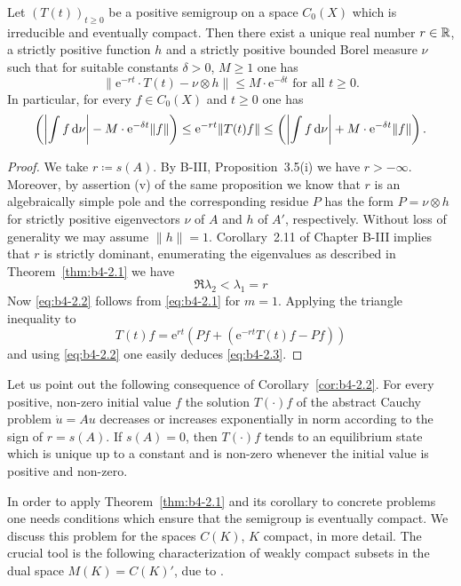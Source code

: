 \begin{corollary}\label{cor:b4-2.2}
	Let $(T(t))_{t \geq 0}$ be a positive semigroup on a space
	$C_{0}(X)$ which is irreducible and eventually compact.
	Then there exist a
	unique real number $r \in \mathbb{R}$, a strictly positive function $h$ and a
	strictly positive bounded Borel measure $\nu$ such that for suitable
	constants $\delta > 0$, $M \geq 1$ one has
	\begin{equation}\label{eq:b4-2.2}
		\|\mathrm{e}^{-rt}\cdot T(t) - \nu\otimes h\| \leq M\cdot \mathrm{e}^{-\delta t} \text{ for all } t \geq 0 .
	\end{equation}
	In particular, for every $f \in C_{0}(X)$ and $t \geq 0$ one has
	\begin{equation}\label{eq:b4-2.3} 
		\left(\left|\int f \mathop{}\!\mathrm{d}{\nu}\right| - M\cdot \mathrm{e}^{-\delta t}\|f\|\right) \leq \mathrm{e}^{-rt}\|T(t)f\| \leq \left(\left|\int f \mathop{}\!\mathrm{d}{\nu}\right| + M\cdot \mathrm{e}^{-\delta t}\|f\|\right).
	\end{equation}
\end{corollary}
\begin{proof}
	We take $r  \coloneq  s(A)$.
	By B-III, Proposition~3.5(i) we have $r > -\infty$.
	Moreover, by assertion (v) of the same proposition we know that $r$ is
	an algebraically simple pole and the corresponding residue $P$ has the
	form $P = \nu \otimes h$ for strictly positive eigenvectors $\nu$ of $A$
	and $h$ of $A'$, respectively.
	Without loss of generality we may assume
	$\|h\| = 1$.
	Corollary~2.11 of Chapter B-III implies that $r$ is strictly
	dominant, \ie enumerating the eigenvalues as described in Theorem~\ref{thm:b4-2.1} we
	have 
\[
	\Re \lambda_2 < \lambda_1 = r 
\]
%
Now \eqref{eq:b4-2.2} follows from \eqref{eq:b4-2.1} for $m = 1$.
Applying the triangle inequality to %
\[
	 T(t)f = \mathrm{e}^{rt}(Pf + (\mathrm{e}^{-rt}T(t)f-Pf)) 
\]
%
and using \eqref{eq:b4-2.2} one easily deduces \eqref{eq:b4-2.3}.
\end{proof}
Let us point out the following consequence of Corollary~\ref{cor:b4-2.2}.
For every positive, non-zero initial value $f$ the solution $T(\cdot)f$
of the abstract Cauchy problem $\dot{u} = Au$ decreases or increases
exponentially in norm according to the sign of $r = s(A)$.
If $s(A) = 0$, then $T(\cdot)f$ tends to an equilibrium state which is
unique up to a constant and is non-zero whenever the initial value is
positive and non-zero.

In order to apply Theorem~\ref{thm:b4-2.1} and its corollary to concrete problems one
needs conditions which ensure that the semigroup is eventually compact.
We discuss this problem for the spaces $C(K)$, $K$ compact, in
more detail.
The crucial tool is the following characterization of
weakly compact subsets in the dual space $M(K) = C(K)'$, due to
\citet{grothendieck:1953}.

